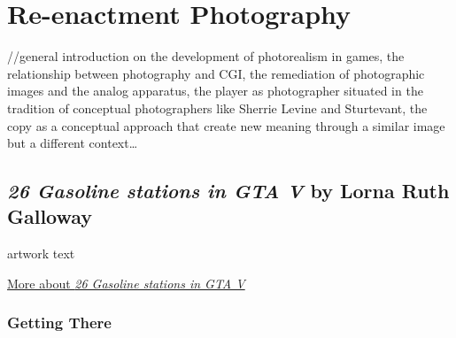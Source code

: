 \documentclass[
  openany]{book}
\begin{document}
\hypertarget{re-enactment-photography}{%
\chapter{Re-enactment Photography}\label{re-enactment-photography}}

//general introduction on the development of photorealism in games, the relationship between photography and CGI, the remediation of photographic images and the analog apparatus, the player as photographer situated in the tradition of conceptual photographers like Sherrie Levine and Sturtevant, the copy as a conceptual approach that create new meaning through a similar image but a different context\ldots{}

\hypertarget{gasoline-stations-in-gta-v-by-lorna-ruth-galloway}{%
\section*{\texorpdfstring{\emph{26 Gasoline stations in GTA V} by Lorna Ruth Galloway}{26 Gasoline stations in GTA V by Lorna Ruth Galloway}}\label{gasoline-stations-in-gta-v-by-lorna-ruth-galloway}}

artwork text

\href{https://www.lornaruthgalloway.com/charcoal-halftone}{More about \emph{26 Gasoline stations in GTA V}}

\hypertarget{getting-there-3}{%
\subsection*{Getting There}\label{getting-there-3}}
\end{document}
